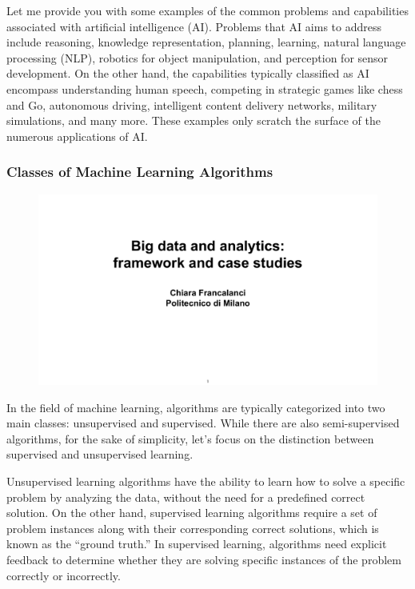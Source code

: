 Let me provide you with some examples of the common problems and
capabilities associated with artificial intelligence (AI). Problems that
AI aims to address include reasoning, knowledge representation,
planning, learning, natural language processing (NLP), robotics for
object manipulation, and perception for sensor development. On the other
hand, the capabilities typically classified as AI encompass
understanding human speech, competing in strategic games like chess and
Go, autonomous driving, intelligent content delivery networks, military
simulations, and many more. These examples only scratch the surface of
the numerous applications of AI.


\subsubsection{Classes of Machine Learning
  Algorithms}\label{classes-of-machine-learning-algorithms}

\begin{figure}[!h]
  \centering
  \includegraphics[page=6, trim = 1.5cm 4cm 1.5cm 4cm, clip, width=\imagewidth]{images/06 - BIG_DATA.pdf}
\end{figure}

In the field of machine learning, algorithms are typically categorized
into two main classes: unsupervised and supervised. While there are also
semi-supervised algorithms, for the sake of simplicity, let's focus on
the distinction between supervised and unsupervised learning.

Unsupervised learning algorithms have the ability to learn how to solve
a specific problem by analyzing the data, without the need for a
predefined correct solution. On the other hand, supervised learning
algorithms require a set of problem instances along with their
corresponding correct solutions, which is known as the ``ground truth.''
In supervised learning, algorithms need explicit feedback to determine
whether they are solving specific instances of the problem correctly or
incorrectly.

